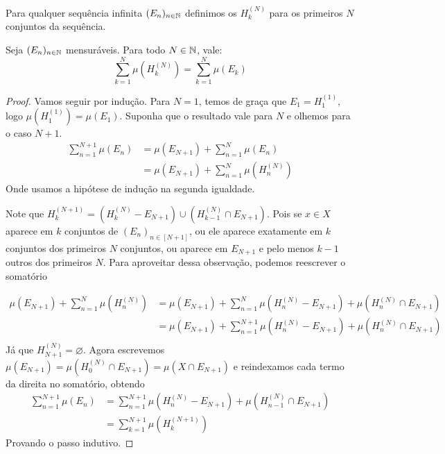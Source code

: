 Para qualquer sequência infinita $(E_n)_{n\in\mathbb{N}}$ definimos os $H_k^{(N)}$ para os primeiros $N$ conjuntos da sequência.

\begin{lemma}
    \label{lemm:hk}
    Seja $(E_n)_{n \in \mathbb{N}}$ mensuráveis. Para todo $N \in \mathbb{N}$, vale:
    $$\sum_{k=1}^{N} \mu(H_k^{(N)}) = \sum_{k=1}^{N} \mu(E_k)$$
\end{lemma}
\begin{proof}
    Vamos seguir por indução. Para $N = 1$, temos de graça que $E_1 = H_1^{(1)}$, logo $\mu(H_1^{(1)}) = \mu(E_1)$.
    Suponha que o resultado vale para $N$ e olhemos para o caso $N+1$.
    \begin{align*}
        \sum_{n=1}^{N+1} \mu(E_n) &= \mu(E_{N+1}) + \sum_{n=1}^{N} \mu(E_n)\\
        &= \mu(E_{N+1}) + \sum_{n=1}^{N} \mu(H_n^{(N)})
    \end{align*}
    Onde usamos a hipótese de indução na segunda igualdade.

    Note que $H_k^{(N+1)} = (H_k^{(N)} - E_{N+1}) \cup (H_{k-1}^{(N)} \cap E_{N+1})$. Pois se $x \in X$ aparece em $k$ conjuntos de $(E_n)_{n \in [N+1]}$,
    ou ele aparece exatamente em $k$ conjuntos dos primeiros $N$ conjuntos, ou aparece em $E_{N+1}$ e pelo menos $k-1$ outros dos primeiros $N$.
    Para aproveitar dessa observação, podemos reescrever o somatório

    \begin{align*}
        \mu(E_{N+1}) + \sum_{n=1}^{N} \mu(H_n^{(N)}) &= \mu(E_{N+1}) + \sum_{n=1}^{N} \mu(H_n^{(N)} - E_{N+1}) + \mu(H_n^{(N)} \cap E_{N+1})\\
        &= \mu(E_{N+1}) + \sum_{n=1}^{N+1} \mu(H_n^{(N)} - E_{N+1}) + \mu(H_n^{(N)} \cap E_{N+1})\\
    \end{align*}
    Já que $H_{N+1}^{(N)} = \varnothing$. Agora escrevemos $\mu(E_{N+1}) = \mu(H_0^{(N)} \cap E_{N+1}) = \mu(X \cap E_{N+1})$ e reindexamos 
    cada termo da direita no somatório, obtendo
    \begin{align*}
        \sum_{n=1}^{N+1} \mu(E_n) &= \sum_{n=1}^{N+1} \mu(H_n^{(N)} - E_{N+1}) + \mu(H_{n-1}^{(N)} \cap E_{N+1})\\
        &= \sum_{k=1}^{N+1} \mu(H_k^{(N+1)})
    \end{align*}
    Provando o passo indutivo.
\end{proof}

